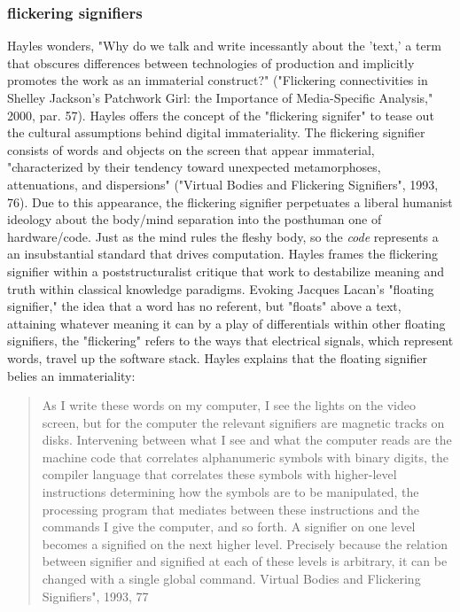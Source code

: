 \documentclass[11pt]{article}
\begin{document}
\subsubsection{flickering signifiers}
\label{sec:orgd4f6a84}
Hayles wonders, "Why do we talk and write incessantly about the
'text,' a term that obscures differences between technologies of
production and implicitly promotes the work as an immaterial
construct?" ("Flickering connectivities in Shelley Jackson's Patchwork
Girl: the Importance of Media-Specific Analysis," 2000,
par. 57). Hayles offers the concept of the "flickering signifer" to
tease out the cultural assumptions behind digital immateriality. The
flickering signifier consists of words and objects on the screen that
appear immaterial, "characterized by their tendency toward unexpected
metamorphoses, attenuations, and dispersions" ("Virtual Bodies and
Flickering Signifiers", 1993, 76). Due to this appearance, the
flickering signifier perpetuates a liberal humanist ideology about the
body/mind separation into the posthuman one of hardware/code. Just as
the mind rules the fleshy body, so the \emph{code} represents a an
insubstantial standard that drives computation. Hayles frames the
flickering signifier within a poststructuralist critique that work to
destabilize meaning and truth within classical knowledge
paradigms. Evoking Jacques Lacan's "floating signifier," the idea that
a word has no referent, but "floats" above a text, attaining whatever
meaning it can by a play of differentials within other floating
signifiers, the "flickering" refers to the ways that electrical
signals, which represent words, travel up the software stack. Hayles
explains that the floating signifier belies an immateriality:
\begin{quote}
As I write these words on my computer, I see the lights on the video
screen, but for the computer the relevant signifiers are magnetic
tracks on disks. Intervening between what I see and what the computer
reads are the machine code that correlates alphanumeric symbols with
binary digits, the compiler language that correlates these symbols
with higher-level instructions determining how the symbols are to be
manipulated, the processing program that mediates between these
instructions and the commands I give the computer, and so forth. A
signifier on one level becomes a signified on the next higher
level. Precisely because the relation between signifier and signified
at each of these levels is arbitrary, it can be changed with a single
global command. Virtual Bodies and Flickering Signifiers", 1993, 77
\end{quote}
\end{document}
